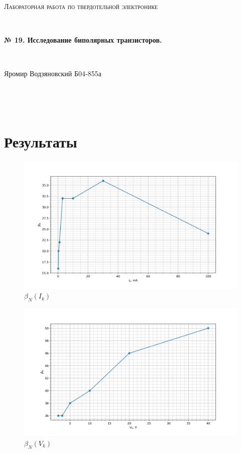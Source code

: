 \documentclass[a4paper]{article}
\begin{document}
\graphicspath{ {pictures/} }
\begin{center}
    {\scshape\Large Лабораторная работа по твердотельной электронике} \par

    \

    {\huge\bfseries № 19. Исследование биполярных транзисторов.} \par 

    \

    {\large Яромир Водзяновский Б04-855а}
\end{center}

\

\

\section{Результаты}

\begin{figure}[H]
    \begin{center}
        \includegraphics[scale = 0.8]{p1.png}
    \end{center}
    \caption{$\beta_N(I_k)$}
    \label{g1}
\end{figure}

\begin{figure}[H]
    \begin{center}
        \includegraphics[scale = 0.8]{p2.png}
    \end{center}
    \caption{$\beta_N(V_k)$}
    \label{g2}
\end{figure}
\end{document}
